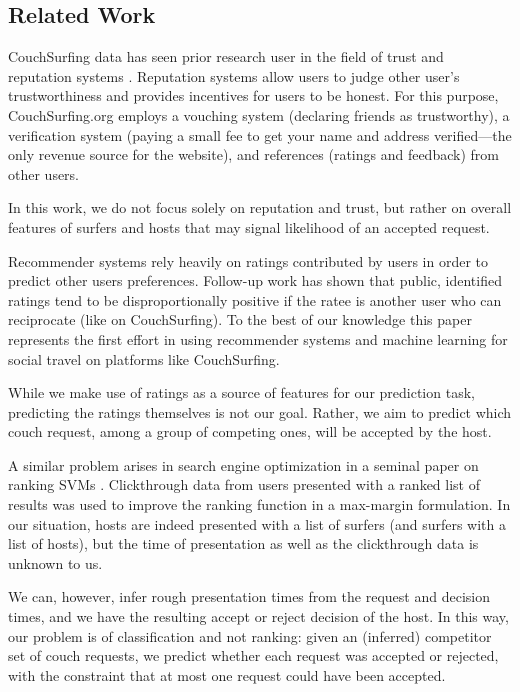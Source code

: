 \subsection{Related Work} \label{sec:related_work}

CouchSurfing data has seen prior research user in the field of trust and reputation systems \cite{Lauterbach2009}.
Reputation systems allow users to judge other user's trustworthiness and provides incentives for users to be honest.
For this purpose, CouchSurfing.org employs a vouching system (declaring friends as trustworthy), a verification system (paying a small fee to get your name and address verified---the only revenue source for the website), and references (ratings and feedback) from other users.

In this work, we do not focus solely on reputation and trust, but rather on overall features of surfers and hosts that may signal likelihood of an accepted request.

Recommender systems rely heavily on ratings contributed by users in order to predict other users preferences.
Follow-up work has shown that public, identified ratings tend to be disproportionally positive if the ratee is another user who can reciprocate \cite{Teng2010} (like on CouchSurfing). 
To the best of our knowledge this paper represents the first effort in using recommender systems and machine learning for social travel on platforms like CouchSurfing.

While we make use of ratings as a source of features for our prediction task, predicting the ratings themselves is not our goal.
Rather, we aim to predict which couch request, among a group of competing ones, will be accepted by the host.

A similar problem arises in search engine optimization in a seminal paper on ranking SVMs \cite{Joachims2002}.
Clickthrough data from users presented with a ranked list of results was used to improve the ranking function in a max-margin formulation.
In our situation, hosts are indeed presented with a list of surfers (and surfers with a list of hosts), but the time of presentation as well as the clickthrough data is unknown to us.

We can, however, infer rough presentation times from the request and decision times, and we have the resulting accept or reject decision of the host.
In this way, our problem is of classification and not ranking: given an (inferred) competitor set of couch requests, we predict whether each request was accepted or rejected, with the constraint that at most one request could have been accepted.

